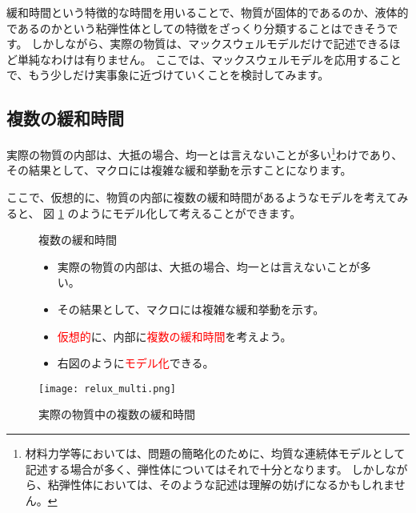 \documentclass[uplatex,dvipdfmx,a4paper,11pt]{jsarticle}
\begin{document}
緩和時間という特徴的な時間を用いることで、物質が固体的であるのか、液体的であるのかという粘弾性体としての特徴をざっくり分類することはできそうです。
しかしながら、実際の物質は、マックスウェルモデルだけで記述できるほど単純なわけは有りません。
ここでは、マックスウェルモデルを応用することで、もう少しだけ実事象に近づけていくことを検討してみます。

\subsection{複数の緩和時間}
実際の物質の内部は、大抵の場合、均一とは言えないことが多い\footnote{
	材料力学等においては、問題の簡略化のために、均質な連続体モデルとして記述する場合が多く、弾性体についてはそれで十分となります。
	しかしながら、粘弾性体においては、そのような記述は理解の妨げになるかもしれません。
}わけであり、その結果として、マクロには複雑な緩和挙動を示すことになります。

ここで、仮想的に、物質の内部に複数の緩和時間があるようなモデルを考えてみると、
図 \ref{fig:relux_multi} のようにモデル化して考えることができます。

\begin{figure}[htb]
	\begin{center}
		\begin{minipage}{0.45\textwidth}
			\begin{itembox}[l]{複数の緩和時間}
				\begin{itemize}
					\item 実際の物質の内部は、大抵の場合、均一とは言えないことが多い。
					\item その結果として、マクロには複雑な緩和挙動を示す。
					\item \textcolor{red}{仮想的}に、内部に\textcolor{red}{複数の緩和時間}を考えよう。
					\item 右図のように\textcolor{red}{モデル化}できる。
				\end{itemize}
			\end{itembox}
		\end{minipage}
		\begin{minipage}{0.45\textwidth}
			\begin{center}
			\texttt{[image: relux\_multi.png]}
			\end{center}
		\end{minipage}
		\caption{実際の物質中の複数の緩和時間}
		\label{fig:relux_multi}
	\end{center}
\end{figure}
\end{document}
